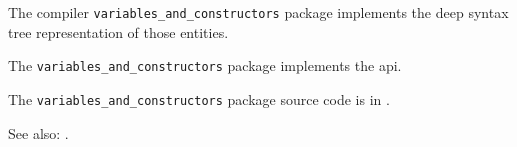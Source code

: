 
The compiler {\tt variables\_and\_constructors} package implements the deep syntax 
tree representation of those entities.

The {\tt variables\_and\_constructors} package implements the  api.

The {\tt variables\_and\_constructors} package source code is in .

See also:  .

